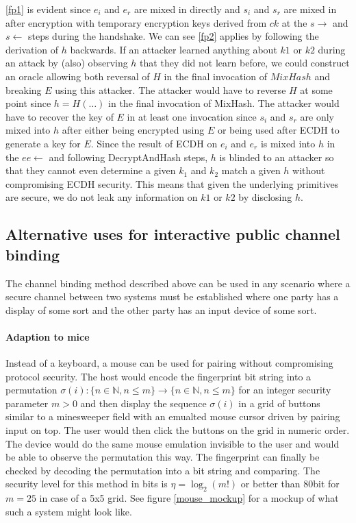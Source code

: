 \documentclass[12pt,a4paper,notitlepage]{article}
\begin{document}
\ref{fp1} is evident since $e_i$ and $e_r$ are mixed in directly and $s_i$ and $s_r$ are mixed in after encryption with
temporary encryption keys derived from $ck$ at the $s\rightarrow$ and $s\leftarrow$ steps during the handshake.
We can see \ref{fp2} applies by following the derivation of $h$ backwards. If an attacker learned anything about $k1$ or
$k2$ during an attack by (also) observing $h$ that they did not learn before, we could construct an oracle allowing both
reversal of $H$ in the final invocation of $MixHash$ and breaking $E$ using this attacker. The attacker would have to
reverse $H$ at some point since $h = H(\hdots)$ in the final invocation of MixHash. The attacker would have to recover
the key of $E$ in at least one invocation since $s_i$ and $s_r$ are only mixed into $h$ after either being encrypted
using $E$ or being used after ECDH to generate a key for $E$. Since the result of ECDH on $e_i$ and $e_r$ is mixed into
$h$ in the $ee\leftarrow$ and following DecryptAndHash steps, $h$ is blinded to an attacker so that they cannot even
determine a given $k_1$ and $k_2$ match a given $h$ without compromising ECDH security.
This means that given the underlying primitives are secure, we do not leak any information on $k1$ or $k2$ by disclosing
$h$.

\subsection{Alternative uses for interactive public channel binding}
\label{altuse}

The channel binding method described above can be used in any scenario where a secure channel between two systems must
be established where one party has a display of some sort and the other party has an input device of some sort. 

\paragraph{Adaption to mice} Instead of a keyboard, a mouse can be used for pairing without compromising protocol
security. The host would encode the fingerprint bit string into a permutation
$\sigma(i) : \{n\in\mathbb N, n\le m\} \rightarrow \{n\in\mathbb N, n\le m\}$ 
for an integer security parameter $m>0$
and then display the sequence $\sigma(i)$ in a grid of buttons similar to a minesweeper field with an emualted mouse
cursor driven by pairing input on top. The user would then click the buttons on the grid in numeric order. The device
would do the same mouse emulation invisible to the user and would be able to observe the permutation this way. The
fingerprint can finally be checked by decoding the permutation into a bit string and comparing. The security level for
this method in bits is $\eta = \log_2(m!)$ or better than 80bit for $m=25$ in case of a 5x5 grid.  See figure
\ref{mouse_mockup} for a mockup of what such a system might look like. 
\end{document}
